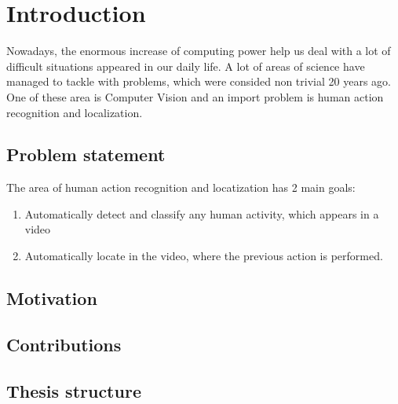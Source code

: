 \chapter{Introduction}
Nowadays, the enormous increase of computing power help us deal with a lot of difficult situations appeared in our daily life.
A lot of areas of science have managed to tackle with problems, which were consided non trivial 20 years ago. One of
these area is Computer Vision and an import problem is human action recognition and localization.
\section{Problem statement}
The area of human action recognition and locatization has 2 main goals:
\begin{enumerate}
\item Automatically detect and classify any human activity, which appears in a video
\item Automatically locate in the video, where the previous action is performed.
\end{enumerate}
\section{Motivation}

\section{Contributions}

\section{Thesis structure}

